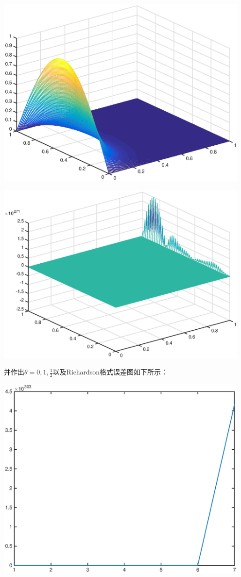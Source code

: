 \documentclass{ctexart}
\begin{document}
\begin{enumerate}
\centerline{\includegraphics[width=5in]{H13_2_4.eps}}

\centerline{\includegraphics[width=5in]{H13_2_5.eps}}

并作出$\theta=0,1,\frac{1}{2}$以及Richardson格式误差图如下所示：

\centerline{\includegraphics[width=5in]{H13_2_0.eps}}


\end{enumerate}
\end{document}
